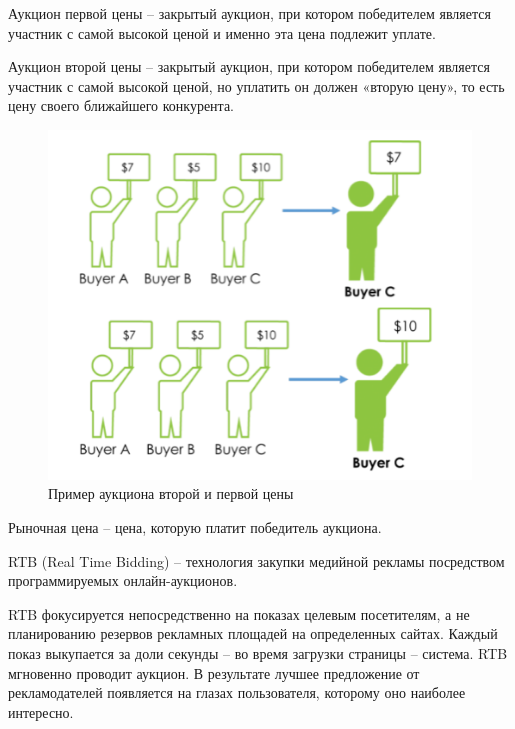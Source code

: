 \documentclass[times,specification,annotation]{itmo-student-thesis}
\begin{document}
\begin{definition}
    Аукцион первой цены – закрытый аукцион, при котором победителем является участник
    с самой высокой ценой и именно эта цена подлежит уплате.
\end{definition}

\begin{definition}
    Аукцион второй цены – закрытый аукцион, при котором победителем является участник с самой высокой ценой,
    но уплатить он должен «вторую цену», то есть цену своего ближайшего конкурента.
\end{definition}

\begin{figure}[h]
    \label{fig:auction}
    \caption{Пример аукциона второй и первой цены}
    \centering
    \includegraphics{s_f_price-auction.png}
\end{figure}

\begin{definition}
    Рыночная цена – цена, которую платит победитель аукциона.
\end{definition}

\begin{definition}
    RTB (Real Time Bidding) – технология закупки медийной рекламы посредством программируемых онлайн-аукционов.
\end{definition}

RTB фокусируется непосредственно на показах целевым посетителям,
а не планированию резервов рекламных площадей на определенных сайтах. 
Каждый показ выкупается за доли секунды – во время загрузки страницы – система. 
RTB мгновенно проводит аукцион. В результате лучшее предложение от рекламодателей появляется на глазах пользователя, которому оно наиболее интересно. 
\end{document}
